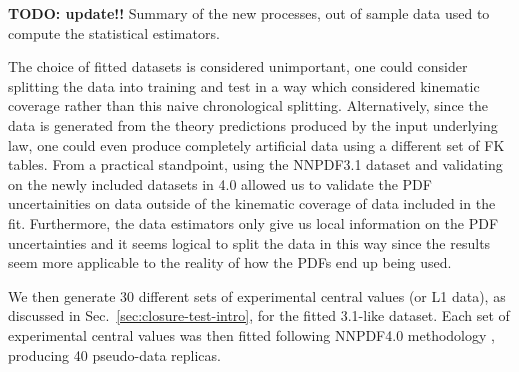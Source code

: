 \begin{table}[h!]
    
    \caption{
        {\bf TODO: update!!}
        Summary of the new processes, out of sample data used to compute the
        statistical estimators.
    }
    \label{tab:summarise_new_data}
\end{table}

The choice of fitted datasets is
considered unimportant, one could consider splitting the data into training
and test in a way which considered kinematic coverage rather than this
naive chronological splitting. Alternatively, since the data is generated from
the theory predictions produced by the input underlying law, one could even
produce completely artificial data using a different set of FK tables. From a
practical standpoint, using the NNPDF3.1 dataset and validating on the newly
included
datasets in 4.0 allowed us to validate the PDF uncertainities on data outside
of the kinematic coverage of data included in the fit. Furthermore, the data estimators
only give us local information on the PDF uncertainties and it seems
logical to split the data in this way since the results seem more applicable to
the reality of how the PDFs end up being used.

We then generate 30 different sets of experimental central values
(or L1 data), as discussed in Sec.~\ref{sec:closure-test-intro}, for the
fitted 3.1-like dataset.
Each set of experimental central values was then
fitted following NNPDF4.0 methodology \cite{NNPDF40},
producing 40 pseudo-data replicas.